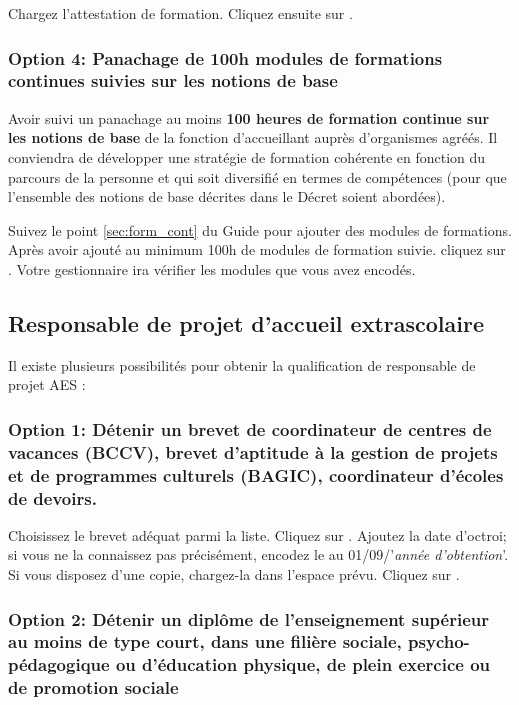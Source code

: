 Chargez l'attestation de formation. Cliquez ensuite sur .

\subsubsection{Option 4: Panachage de 100h modules de formations continues suivies sur les notions de base}
Avoir suivi un panachage au moins \textbf{100 heures de formation continue sur les notions de base} de la fonction d’accueillant auprès d'organismes agréés. Il conviendra  de  développer  une  stratégie de formation  cohérente en fonction du parcours de la personne et qui soit diversifié en termes de compétences (pour que l’ensemble des notions de base décrites dans le Décret soient abordées).

Suivez le point \ref{sec:form_cont} du Guide pour ajouter des modules de formations. Après avoir ajouté au minimum 100h de modules de formation suivie. cliquez sur . Votre gestionnaire ira vérifier les modules que vous avez encodés.

\subsection{Responsable de projet d'accueil extrascolaire} \label{ssec:responsable_aes}
Il existe plusieurs possibilités pour obtenir la qualification de responsable de projet AES :

\subsubsection{Option 1: Détenir un brevet de coordinateur de centres de vacances (BCCV), brevet d’aptitude à la gestion de projets et de programmes culturels (BAGIC), coordinateur d’écoles de devoirs.}


Choisissez le brevet adéquat parmi la liste. Cliquez sur . Ajoutez la date d'octroi; si vous ne la connaissez pas précisément, encodez le au 01/09/'\textit{année d'obtention}'. Si vous disposez d'une copie, chargez-la dans l'espace prévu. Cliquez sur .


\subsubsection{Option 2: Détenir un diplôme de l’enseignement supérieur au moins de type court, dans une filière sociale, psycho-pédagogique ou d’éducation physique, de plein exercice ou de promotion sociale}

